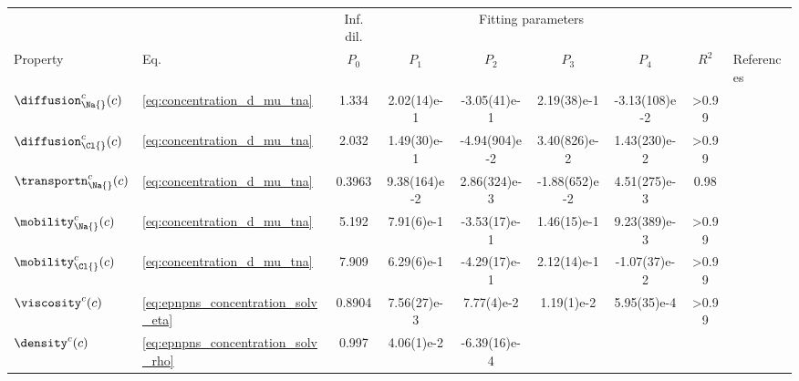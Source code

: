 %
\begin{landscape}
  \hspace{-1.5cm}
  \begin{threeparttable}[p]
    \centering
       \captionsetup{width=19.25cm}
    \caption{Overview of the  fitting parameters used for interpolation.}
    \label{tab:corrections_parameters}
    \renewcommand{\arraystretch}{2}
    \scriptsize
    \begin{tabularx}{19.25cm}{@{}
            l l S[table-format=1.3] S[table-format=-1.2(2)e-1] S[table-format=-1.2(2)e-1]
            S[table-format=-1.2(2)e-1] S[table-format=-1.2(2)e-1] S[table-format=>1.2] l @{}}
      \toprule
        & & {Inf. dil.} &  & & \\
      \cmidrule(r){3-3} \cmidrule(l){4-7} Property & Eq. & $P_{0}$ & $P_{1}$ & $P_{2}$ & $P_{3}$ & $P_{4}$ &
      $R^{2}$ & References \\
      \midrule
      $\diffusion_{\Na{}}^c(c)$ & \cref{eq:concentration_d_mu_tna} & 1.334  & 2.02(14)e-1 &
      -3.05(41)e-1 & 2.19(38)e-1 & -3.13(108)e-2 & >0.99 & \cite{Mills-1989} \\
      $\diffusion_{\Cl{}}^c(c)$ & \cref{eq:concentration_d_mu_tna} & 2.032  & 1.49(30)e-1 &
      -4.94(904)e-2 & 3.40(826)e-2 & 1.43(230)e-2 & >0.99 & \cite{Mills-1989} \\
      $\transportn_{\Na{}}^c(c)$ & \cref{eq:concentration_d_mu_tna} & 0.3963 & 9.38(164)e-2 & 2.86(324)e-3 &
      -1.88(652)e-2 & 4.51(275)e-3 & 0.98 &
      \cite{Esteso-1976,Haynes-2017,DellaMonica-1979,Panopoulos-1986,Schonert-2013}\\
      $\mobility_{\Na{}}^c(c)$ & \cref{eq:concentration_d_mu_tna} & 5.192  & 7.91(6)e-1 &
      -3.53(17)e-1 & 1.46(15)e-1 & 9.23(389)e-3 & >0.99 &
      \cite{Bianchi-1989,Currie-1960,Goldsack-1976,DellaMonica-1979} \\
      $\mobility_{\Cl{}}^c(c)$ & \cref{eq:concentration_d_mu_tna} & 7.909  & 6.29(6)e-1 &
      -4.29(17)e-1 & 2.12(14)e-1 & -1.07(37)e-2 & >0.99 &
      \cite{Bianchi-1989,Currie-1960,Goldsack-1976,DellaMonica-1979} \\
      $\viscosity^c(c)$ & \cref{eq:epnpns_concentration_solv_eta} & 0.8904  & 7.56(27)e-3 &
      7.77(4)e-2 & 1.19(1)e-2 & 5.95(35)e-4 & >0.99 & \cite{Hai-Lang-1996} \\
      $\density^c(c)$ & \cref{eq:epnpns_concentration_solv_rho} & 0.997  & 4.06(1)e-2 & -6.39(16)e-4

\end{tabularx}
\end{threeparttable}
\end{landscape}
